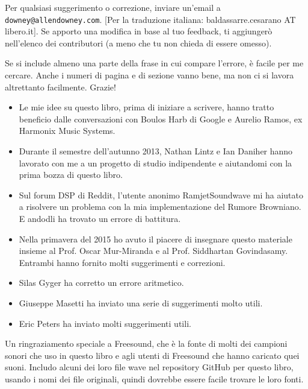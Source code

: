 \documentclass[12pt]{book} \usepackage[width=5.5in,height=8.5in, hmarginratio=3:2,vmarginratio=1:1]{geometry}
\begin{document}
Per qualsiasi suggerimento o correzione, inviare un'email a {\tt downey@allendowney.com}. [Per la traduzione italiana: baldassarre.cesarano AT libero.it]. Se apporto una modifica in base al tuo feedback, ti aggiungerò nell'elenco dei contributori (a meno che tu non chieda di essere omesso).  

Se si include almeno una parte della frase in cui compare l'errore, è facile per me cercare. Anche i numeri di pagina e di sezione vanno bene, ma non ci si lavora altrettanto facilmente. Grazie!

\small

\begin{itemize} 

\item Le mie idee su questo libro, prima di iniziare a scrivere, hanno tratto beneficio dalle conversazioni con Boulos Harb di Google e Aurelio Ramos, ex Harmonix Music Systems.

\item Durante il semestre dell'autunno 2013, Nathan Lintz e Ian Daniher hanno lavorato con me a un progetto di studio indipendente e aiutandomi con la prima bozza di questo libro.

\item Sul forum DSP di Reddit, l'utente anonimo RamjetSoundwave mi ha aiutato a risolvere un problema con la mia implementazione del Rumore Browniano. E andodli ha trovato un errore di battitura.

\item Nella primavera del 2015 ho avuto il piacere di insegnare questo materiale insieme al Prof. Oscar Mur-Miranda e al Prof. Siddhartan Govindasamy. Entrambi hanno fornito molti suggerimenti e correzioni.

\item Silas Gyger ha corretto un errore aritmetico.

\item Giuseppe Masetti ha inviato una serie di suggerimenti molto utili.

\item Eric Peters ha inviato molti suggerimenti utili.

\end{itemize} 

Un ringraziamento speciale a Freesound, che è la fonte di molti dei campioni sonori che uso in questo libro e agli utenti di Freesound che hanno caricato quei suoni. Includo alcuni dei loro file wave nel repository GitHub per questo libro, usando i nomi dei file originali, quindi dovrebbe essere facile trovare le loro fonti.
\end{document}
